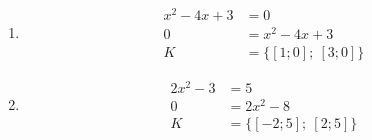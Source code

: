 \documentclass[11pt,a4paper]{article}
\begin{document}
\begin{zadaniReseniBox}[title={Domácí úkol}]
\begin{enumerate}[label=\alph*),itemsep=2pt]
\[\begin{aligned}
- x^{2} + 2x + 3&=2\\[2pt]
0&=- x^{2} + 2x + 1\\[2pt]
K&=\{[1 - \sqrt{2};2];\ [1 + \sqrt{2};2]\}
\end{aligned}\]
\item
\[\begin{aligned}
x^{2} - 4x + 3&=0\\[2pt]
0&=x^{2} - 4x + 3\\[2pt]
K&=\{[1;0];\ [3;0]\}
\end{aligned}\]
\item
\[\begin{aligned}
2x^{2} - 3&=5\\[2pt]
0&=2x^{2} - 8\\[2pt]
K&=\{[-2;5];\ [2;5]\}
\end{aligned}\]
\end{enumerate}
\end{zadaniReseniBox}
\end{document}

